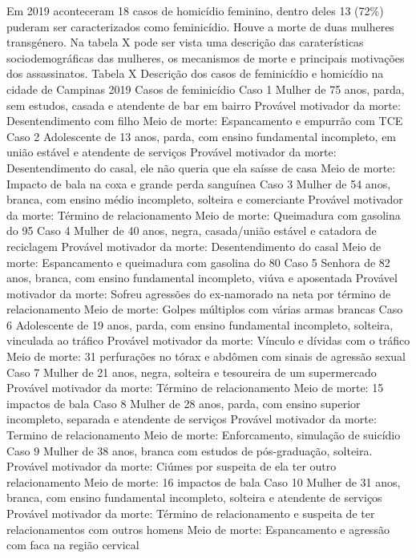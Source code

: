 Em 2019 aconteceram 18 casos de homicídio feminino, dentro deles 13 (72\%) puderam ser caracterizados como feminicídio. Houve a morte de duas mulheres transgénero. Na tabela X pode ser vista uma descrição das caraterísticas sociodemográficas das mulheres, os mecanismos de morte e principais motivações dos assassinatos.
Tabela X Descrição dos casos de feminicídio e homicídio na cidade de Campinas 2019
Casos de feminicídio
Caso 1 
Mulher de 75 anos, parda, sem estudos, casada e atendente de bar em bairro
Provável motivador da morte: Desentendimento com filho Meio de morte: Espancamento e empurrão com TCE
Caso 2
Adolescente de 13 anos, parda, com ensino fundamental incompleto, em união estável e atendente de serviços
Provável motivador da morte: Desentendimento do casal, ele não queria que ela saísse de casa Meio de morte: Impacto de bala na coxa e grande perda sanguínea 
Caso 3 
Mulher de 54 anos, branca, com ensino médio incompleto, solteira e comerciante 
Provável motivador da morte: Término de relacionamento Meio de morte: Queimadura com gasolina do 95%
Caso 4 
Mulher de 40 anos, negra, casada/união estável e catadora de reciclagem
Provável motivador da morte: Desentendimento do casal Meio de morte: Espancamento e queimadura com gasolina do 80%
Caso 5 
Senhora de 82 anos, branca, com ensino fundamental incompleto, viúva e aposentada
Provável motivador da morte: Sofreu agressões do ex-namorado na neta por término de relacionamento Meio de morte: Golpes múltiplos com várias armas brancas
Caso 6 
Adolescente de 19 anos, parda, com ensino fundamental incompleto, solteira, vinculada ao tráfico
Provável motivador da morte: Vínculo e dívidas com o tráfico Meio de morte: 31 perfurações no tórax e abdômen com sinais de agressão sexual
Caso 7 
Mulher de 21 anos, negra, solteira e tesoureira de um supermercado
Provável motivador da morte: Término de relacionamento Meio de morte: 15 impactos de bala
Caso 8 
Mulher de 28 anos, parda, com ensino superior incompleto, separada e atendente de serviços
Provável motivador da morte: Termino de relacionamento Meio de morte: Enforcamento, simulação de suicídio
Caso 9 
Mulher de 38 anos, branca com estudos de pós-graduação, solteira.
Provável motivador da morte: Ciúmes por suspeita de ela ter outro relacionamento Meio de morte: 16 impactos de bala
Caso 10 
Mulher de 31 anos, branca, com ensino fundamental incompleto, solteira e atendente de serviços
Provável motivador da morte: Término de relacionamento e suspeita de ter relacionamentos com outros homens Meio de morte: Espancamento e agressão com faca na região cervical
